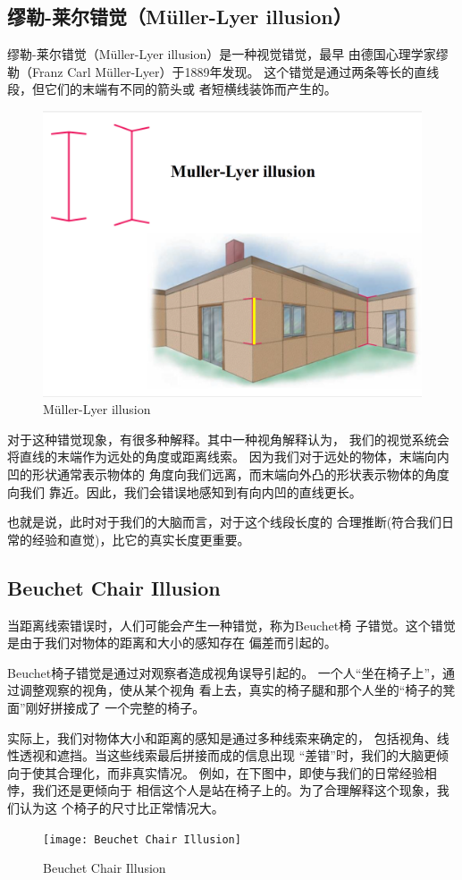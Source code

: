 \documentclass[12pt,a4paper]{ctexart}
\begin{document}
	\subsection{缪勒-莱尔错觉（Müller-Lyer illusion）}
	缪勒-莱尔错觉（Müller-Lyer illusion）是一种视觉错觉，最早
	由德国心理学家缪勒（Franz Carl Müller-Lyer）于1889年发现。
	这个错觉是通过两条等长的直线段，但它们的末端有不同的箭头或
	者短横线装饰而产生的。
	\begin{figure}[h]
		\centering
    	\includegraphics[width=0.65\columnwidth,height=0.45\linewidth]{Muller-Lyer_illusion}
    	\caption{Müller-Lyer illusion}
	\end{figure}

	对于这种错觉现象，有很多种解释。其中一种视角解释认为，
	我们的视觉系统会将直线的末端作为远处的角度或距离线索。
	因为我们对于远处的物体，末端向内凹的形状通常表示物体的
	角度向我们远离，而末端向外凸的形状表示物体的角度向我们
	靠近。因此，我们会错误地感知到有向内凹的直线更长。

	也就是说，此时对于我们的大脑而言，对于这个线段长度的
	合理推断(符合我们日常的经验和直觉)，比它的真实长度更重要。

	\subsection{Beuchet Chair Illusion}
	当距离线索错误时，人们可能会产生一种错觉，称为Beuchet椅
	子错觉。这个错觉是由于我们对物体的距离和大小的感知存在
	偏差而引起的。

	Beuchet椅子错觉是通过对观察者造成视角误导引起的。
	一个人“坐在椅子上”，通过调整观察的视角，使从某个视角
	看上去，真实的椅子腿和那个人坐的“椅子的凳面”刚好拼接成了
	一个完整的椅子。

	实际上，我们对物体大小和距离的感知是通过多种线索来确定的，
	包括视角、线性透视和遮挡。当这些线索最后拼接而成的信息出现
	“差错”时，我们的大脑更倾向于使其合理化，而非真实情况。
	例如，在下图中，即使与我们的日常经验相悖，我们还是更倾向于
	相信这个人是站在椅子上的。为了合理解释这个现象，我们认为这
	个椅子的尺寸比正常情况大。
	\begin{figure}[h]
		\centering
    	\texttt{[image: Beuchet Chair Illusion]}
    	\caption{Beuchet Chair Illusion}
	\end{figure}
\end{document}

